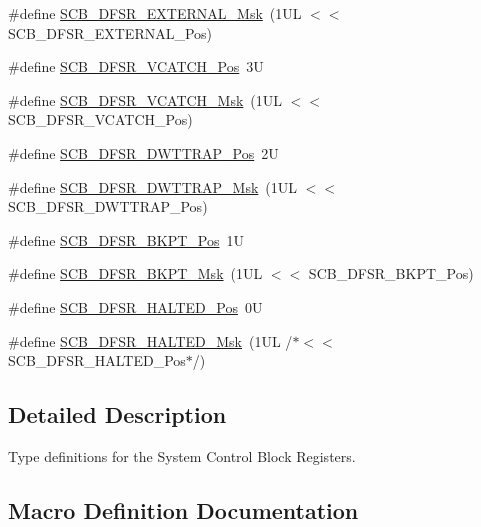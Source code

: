 \begin{DoxyCompactItemize}
\#define \hyperlink{group___c_m_s_i_s___s_c_b_ga3cba2ec1f588ce0b10b191d6b0d23399}{S\+C\+B\+\_\+\+D\+F\+S\+R\+\_\+\+E\+X\+T\+E\+R\+N\+A\+L\+\_\+\+Msk}~(1\+U\+L $<$$<$ S\+C\+B\+\_\+\+D\+F\+S\+R\+\_\+\+E\+X\+T\+E\+R\+N\+A\+L\+\_\+\+Pos)
\item 
\#define \hyperlink{group___c_m_s_i_s___s_c_b_gad02d3eaf062ac184c18a7889c9b6de57}{S\+C\+B\+\_\+\+D\+F\+S\+R\+\_\+\+V\+C\+A\+T\+C\+H\+\_\+\+Pos}~3U
\item 
\#define \hyperlink{group___c_m_s_i_s___s_c_b_gacbb931575c07b324ec793775b7c44d05}{S\+C\+B\+\_\+\+D\+F\+S\+R\+\_\+\+V\+C\+A\+T\+C\+H\+\_\+\+Msk}~(1\+U\+L $<$$<$ S\+C\+B\+\_\+\+D\+F\+S\+R\+\_\+\+V\+C\+A\+T\+C\+H\+\_\+\+Pos)
\item 
\#define \hyperlink{group___c_m_s_i_s___s_c_b_gaccf82364c6d0ed7206f1084277b7cc61}{S\+C\+B\+\_\+\+D\+F\+S\+R\+\_\+\+D\+W\+T\+T\+R\+A\+P\+\_\+\+Pos}~2U
\item 
\#define \hyperlink{group___c_m_s_i_s___s_c_b_ga3f7384b8a761704655fd45396a305663}{S\+C\+B\+\_\+\+D\+F\+S\+R\+\_\+\+D\+W\+T\+T\+R\+A\+P\+\_\+\+Msk}~(1\+U\+L $<$$<$ S\+C\+B\+\_\+\+D\+F\+S\+R\+\_\+\+D\+W\+T\+T\+R\+A\+P\+\_\+\+Pos)
\item 
\#define \hyperlink{group___c_m_s_i_s___s_c_b_gaf28fdce48655f0dcefb383aebf26b050}{S\+C\+B\+\_\+\+D\+F\+S\+R\+\_\+\+B\+K\+P\+T\+\_\+\+Pos}~1U
\item 
\#define \hyperlink{group___c_m_s_i_s___s_c_b_ga609edf8f50bc49adb51ae28bcecefe1f}{S\+C\+B\+\_\+\+D\+F\+S\+R\+\_\+\+B\+K\+P\+T\+\_\+\+Msk}~(1\+U\+L $<$$<$ S\+C\+B\+\_\+\+D\+F\+S\+R\+\_\+\+B\+K\+P\+T\+\_\+\+Pos)
\item 
\#define \hyperlink{group___c_m_s_i_s___s_c_b_gaef4ec28427f9f88ac70a13ae4e541378}{S\+C\+B\+\_\+\+D\+F\+S\+R\+\_\+\+H\+A\+L\+T\+E\+D\+\_\+\+Pos}~0U
\item 
\#define \hyperlink{group___c_m_s_i_s___s_c_b_ga200bcf918d57443b5e29e8ce552e4bdf}{S\+C\+B\+\_\+\+D\+F\+S\+R\+\_\+\+H\+A\+L\+T\+E\+D\+\_\+\+Msk}~(1\+U\+L /$\ast$$<$$<$ S\+C\+B\+\_\+\+D\+F\+S\+R\+\_\+\+H\+A\+L\+T\+E\+D\+\_\+\+Pos$\ast$/)
\end{DoxyCompactItemize}


\subsection{Detailed Description}
Type definitions for the System Control Block Registers. 



\subsection{Macro Definition Documentation}
\mbox{\label{group___c_m_s_i_s___s_c_b_gabfc67aa93bca5ddd4b0f0a47b372383e}} 
